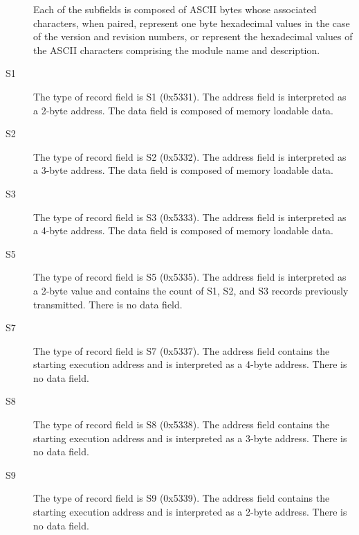 \begin{description}
                        Each of the subfields is composed of ASCII bytes whose
                        associated characters, when paired, represent one byte
                        hexadecimal values in the case of the version and revision
                        numbers, or represent the hexadecimal values of the ASCII
                        characters comprising the module name and description.
                \item[S1]
                    The type of record field is S1 (0x5331). The address field is
                    interpreted as a 2-byte address. The data field is composed of
                    memory loadable data.
                \item[S2]
                    The type of record field is S2 (0x5332). The address field is
                    interpreted as a 3-byte address. The data field is composed of
                    memory loadable data.
                \item[S3]
                    The type of record field is S3 (0x5333). The address field is
                    interpreted as a 4-byte address. The data field is composed of
                    memory loadable data.
                \item[S5]
                    The type of record field is S5 (0x5335). The address field is
                    interpreted as a 2-byte value and contains the count of S1, S2, and
                    S3 records previously transmitted. There is no data field.
                \item[S7]
                    The type of record field is S7 (0x5337). The address field
                    contains the starting execution address and is interpreted as a
                    4-byte address. There is no data field.
                \item[S8]
                    The type of record field is S8 (0x5338). The address field
                    contains the starting execution address and is interpreted as a
                    3-byte address. There is no data field.
                \item[S9]
                    The type of record field is S9 (0x5339). The address field
                    contains the starting execution address and is interpreted as a
                    2-byte address. There is no data field.
                \end{description}

